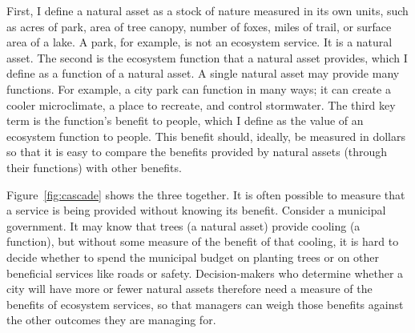 \documentclass[12pt]{article}
\begin{document}
First, I define a natural asset as a stock of nature measured in its own units, such as acres of park, area of tree canopy, number of foxes, miles of trail, or surface area of a lake. A park, for example, is not an ecosystem service. It is a natural asset. The second is the ecosystem function that a natural asset provides, which I define as a function of a natural asset. A single natural asset may provide many functions. For example, a city park can function in many ways; it can create a cooler microclimate, a place to recreate, and control stormwater. The third key term is the function's benefit to people, which I define as the value of an ecosystem function to people. This benefit should, ideally, be measured in dollars so that it is easy to compare the benefits provided by natural assets (through their functions) with other benefits. 

Figure~\ref{fig:cascade} shows the three together. It is often possible to measure that a service is being provided without knowing its benefit. Consider a municipal government. It may know that trees (a natural asset) provide cooling (a function), but without some measure of the benefit of that cooling, it is hard to decide whether to spend the municipal budget on planting trees or on other beneficial services like roads or safety. Decision-makers who determine whether a city will have more or fewer natural assets therefore need a measure of the benefits of ecosystem services, so that managers can weigh those benefits against the other outcomes they are managing for.

\end{document}
